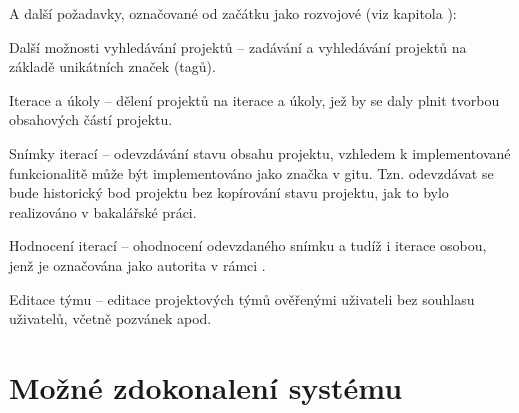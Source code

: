 A další požadavky, označované od začátku jako rozvojové (viz kapitola ):


\begin{dl}
   \item[Další možnosti vyhledávání projektů] – zadávání a vyhledávání projektů na základě unikátních značek (tagů).
   \item[Iterace a úkoly] – dělení projektů na iterace a úkoly, jež by se daly plnit tvorbou obsahových částí projektu.
   \item[Snímky iterací] – odevzdávání stavu obsahu projektu, vzhledem k implementované funkcionalitě může být implementováno jako značka v gitu.
   Tzn.
   odevzdávat se bude historický bod projektu bez kopírování stavu projektu, jak to bylo realizováno v bakalářské práci.
   \item[Hodnocení iterací] – ohodnocení odevzdaného snímku a tudíž i iterace osobou, jenž je označována jako autorita v rámci .
   \item[Editace týmu] – editace projektových týmů ověřenými uživateli bez souhlasu uživatelů, včetně pozvánek apod.
\end{dl}


\newpage



\section{Možné zdokonalení systému}\label{sec:improvements}


